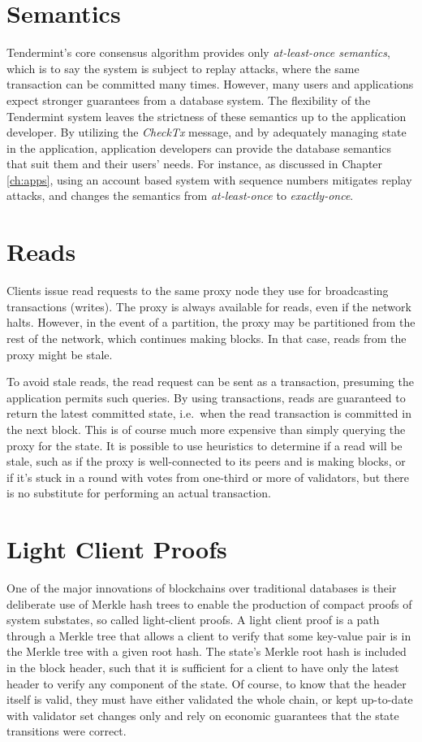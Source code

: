 \section{Semantics}

Tendermint's core consensus algorithm provides only \emph{at-least-once semantics}, 
which is to say the system is subject to replay attacks, 
where the same transaction can be committed many times.
However, many users and applications expect stronger guarantees from a database system.
The flexibility of the Tendermint system leaves the strictness of these semantics up to the application developer.
By utilizing the \emph{CheckTx} message, and by adequately managing state in the application, 
application developers can provide the database semantics that suit them and their users' needs.
For instance, as discussed in Chapter \ref{ch:apps}, 
using an account based system with sequence numbers mitigates replay attacks,
and changes the semantics from \emph{at-least-once} to \emph{exactly-once}.

\section{Reads} 

Clients issue read requests to the same proxy node they use for broadcasting transactions (writes).
The proxy is always available for reads, even if the network halts.
However, in the event of a partition, the proxy may be partitioned from the rest of the network, which continues making blocks.
In that case, reads from the proxy might be stale.

To avoid stale reads, the read request can be sent as a transaction, presuming the application permits such queries.
By using transactions, reads are guaranteed to return the latest committed state, i.e.~when the read transaction is committed in the next block.
This is of course much more expensive than simply querying the proxy for the state.
It is possible to use heuristics to determine if a read will be stale,
such as if the proxy is well-connected to its peers and is making blocks, 
or if it's stuck in a round with votes from one-third or more of validators,
but there is no substitute for performing an actual transaction.

\section{Light Client Proofs}

One of the major innovations of blockchains over traditional databases is their deliberate use of Merkle hash trees to enable the production
of compact proofs of system substates, so called light-client proofs.
A light client proof is a path through a Merkle tree that allows a client to verify that some key-value pair is in the Merkle tree with a given root hash.
The state's Merkle root hash is included in the block header, such that it is sufficient for a client to have only the latest header to verify any component of the state.
Of course, to know that the header itself is valid, they must have either validated the whole chain, 
or kept up-to-date with validator set changes only and rely on economic guarantees that the state transitions were correct.


